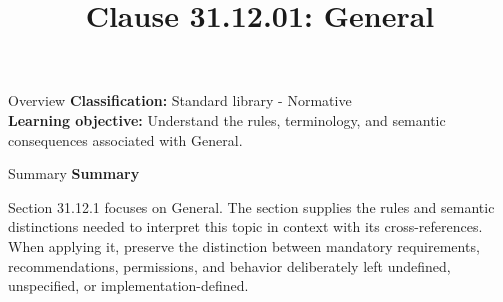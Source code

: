 \documentclass[10pt,letterpaper]{article}
\title{Clause 31.12.01: General}
\author{}
\date{}
\begin{document}
\maketitle
\begin{CornellOverviewBox}{Overview}
\textbf{Classification:} Standard library - Normative\\[2pt]
\textbf{Learning objective:} Understand the rules, terminology, and semantic consequences associated with General.
\end{CornellOverviewBox}\begin{CornellSummaryBox}{Summary}
{\sffamily\bfseries\color{Accent} Summary}\par\vspace{3pt}Section 31.12.1 focuses on General. The section supplies the rules and semantic distinctions needed to interpret this topic in context with its cross-references. When applying it, preserve the distinction between mandatory requirements, recommendations, permissions, and behavior deliberately left undefined, unspecified, or implementation-defined.
\end{CornellSummaryBox}
\end{document}
